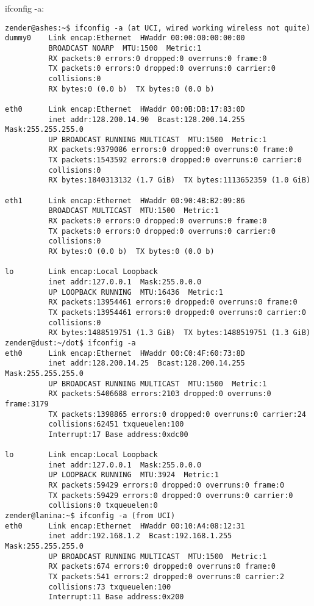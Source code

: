 \documentclass[12pt,twoside]{article}
\begin{document}
ifconfig -a:
\begin{verbatim}
zender@ashes:~$ ifconfig -a (at UCI, wired working wireless not quite)
dummy0    Link encap:Ethernet  HWaddr 00:00:00:00:00:00
          BROADCAST NOARP  MTU:1500  Metric:1
          RX packets:0 errors:0 dropped:0 overruns:0 frame:0
          TX packets:0 errors:0 dropped:0 overruns:0 carrier:0
          collisions:0
          RX bytes:0 (0.0 b)  TX bytes:0 (0.0 b)

eth0      Link encap:Ethernet  HWaddr 00:0B:DB:17:83:0D
          inet addr:128.200.14.90  Bcast:128.200.14.255  Mask:255.255.255.0
          UP BROADCAST RUNNING MULTICAST  MTU:1500  Metric:1
          RX packets:9379086 errors:0 dropped:0 overruns:0 frame:0
          TX packets:1543592 errors:0 dropped:0 overruns:0 carrier:0
          collisions:0
          RX bytes:1840313132 (1.7 GiB)  TX bytes:1113652359 (1.0 GiB)

eth1      Link encap:Ethernet  HWaddr 00:90:4B:B2:09:86
          BROADCAST MULTICAST  MTU:1500  Metric:1
          RX packets:0 errors:0 dropped:0 overruns:0 frame:0
          TX packets:0 errors:0 dropped:0 overruns:0 carrier:0
          collisions:0
          RX bytes:0 (0.0 b)  TX bytes:0 (0.0 b)

lo        Link encap:Local Loopback
          inet addr:127.0.0.1  Mask:255.0.0.0
          UP LOOPBACK RUNNING  MTU:16436  Metric:1
          RX packets:13954461 errors:0 dropped:0 overruns:0 frame:0
          TX packets:13954461 errors:0 dropped:0 overruns:0 carrier:0
          collisions:0
          RX bytes:1488519751 (1.3 GiB)  TX bytes:1488519751 (1.3 GiB)
zender@dust:~/dot$ ifconfig -a
eth0      Link encap:Ethernet  HWaddr 00:C0:4F:60:73:8D
          inet addr:128.200.14.25  Bcast:128.200.14.255  Mask:255.255.255.0
          UP BROADCAST RUNNING MULTICAST  MTU:1500  Metric:1
          RX packets:5406688 errors:2103 dropped:0 overruns:0 frame:3179
          TX packets:1398865 errors:0 dropped:0 overruns:0 carrier:24
          collisions:62451 txqueuelen:100
          Interrupt:17 Base address:0xdc00
 
lo        Link encap:Local Loopback
          inet addr:127.0.0.1  Mask:255.0.0.0
          UP LOOPBACK RUNNING  MTU:3924  Metric:1
          RX packets:59429 errors:0 dropped:0 overruns:0 frame:0
          TX packets:59429 errors:0 dropped:0 overruns:0 carrier:0
          collisions:0 txqueuelen:0                                                     
zender@lanina:~$ ifconfig -a (from UCI)
eth0      Link encap:Ethernet  HWaddr 00:10:A4:08:12:31  
          inet addr:192.168.1.2  Bcast:192.168.1.255  Mask:255.255.255.0
          UP BROADCAST RUNNING MULTICAST  MTU:1500  Metric:1
          RX packets:674 errors:0 dropped:0 overruns:0 frame:0
          TX packets:541 errors:2 dropped:0 overruns:0 carrier:2
          collisions:73 txqueuelen:100 
          Interrupt:11 Base address:0x200 


\end{verbatim}
\end{document}
